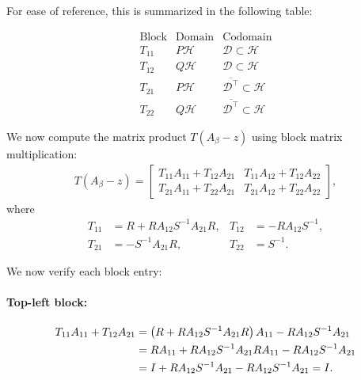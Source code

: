 \documentclass[reqno,12pt,letterpaper]{amsart}
\numberwithin{equation}{section}
\newcommand{\1}{\mathds{1}}
\theoremstyle{definition}
\begin{document}
	For ease of reference, this is summarized in the following table:
	
	\[
	\begin{array}{c|c|c}
		\text{Block} & \text{Domain} & \text{Codomain} \\
		\hline
		T_{11} & P \mathcal{H} & \mathcal{D} \subset \mathcal{H} \\
		T_{12} & Q \mathcal{H} & \mathcal{D} \subset \mathcal{H} \\
		T_{21} & P \mathcal{H} & \overline{\mathcal{D}^\intercal} \subset \mathcal{H} \\
		T_{22} & Q \mathcal{H} & \overline{\mathcal{D}^\intercal} \subset \mathcal{H}
	\end{array}
	\]
	
	
	
	
	
	
	
	
	
	
	
	
	
	
	
	
	We now compute the matrix product \( T (A_\beta - z) \) using block matrix multiplication:
	\begin{align}
		T (A_\beta - z) =
		\begin{bmatrix}
			T_{11} A_{11} + T_{12} A_{21} & T_{11} A_{12} + T_{12} A_{22} \\
			T_{21} A_{11} + T_{22} A_{21} & T_{21} A_{12} + T_{22} A_{22}
		\end{bmatrix},
	\end{align}
	where
	\begin{align}
		T_{11} &= R + R A_{12} S^{-1} A_{21} R, & T_{12} &= - R A_{12} S^{-1}, \\
		T_{21} &= - S^{-1} A_{21} R, & T_{22} &= S^{-1}.
	\end{align}
	
	We now verify each block entry:
	
	\paragraph{Top-left block:}
	\begin{align}
		T_{11} A_{11} + T_{12} A_{21}
		&= \left(R + R A_{12} S^{-1} A_{21} R\right) A_{11} - R A_{12} S^{-1} A_{21} \notag \\
		&= R A_{11} + R A_{12} S^{-1} A_{21} R A_{11} - R A_{12} S^{-1} A_{21} \notag \\
		&= I + R A_{12} S^{-1} A_{21} - R A_{12} S^{-1} A_{21} = I.
	\end{align}
	
\end{document}
